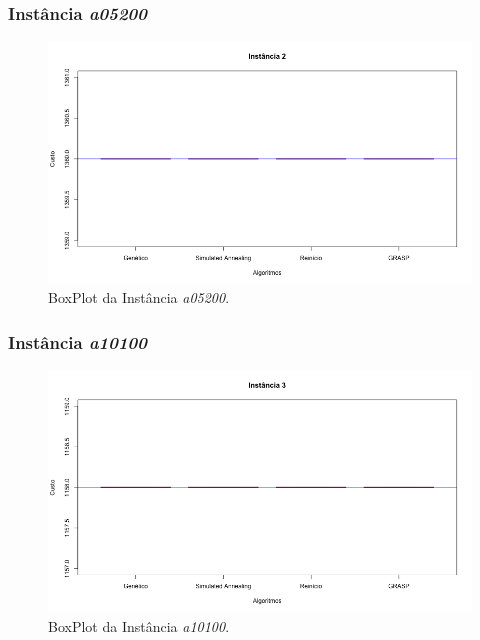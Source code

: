 \documentclass[portugues, brazil, a4paper,12pt]{article}
\begin{document}
		\subsubsection{Instância \textit{a05200}}
			\begin{figure}[H]
				\centering
				\includegraphics[width=1\linewidth]{img/2.png}
				\caption{BoxPlot da Instância \textit{a05200}.}
				\label{fig:a05200}
			\end{figure}
	
		\subsubsection{Instância \textit{a10100}}
			\begin{figure}[H]
				\centering
				\includegraphics[width=1\linewidth]{img/3.png}
				\caption{BoxPlot da Instância \textit{a10100}.}
				\label{fig:a10100}
			\end{figure}
	
\end{document}
